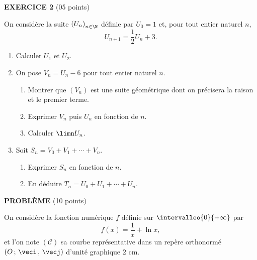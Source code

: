 \begin{devoirsurveille}
\vspace{0.7em}
\noindent\textbf{\sffamily EXERCICE 2} \hfill \textup{(05 points)}

On considère la suite $\left(U_{n}\right)_{n \in \N}$ définie par
$U_{0} = 1$ et, pour tout entier naturel $n$,
\[
  U_{n+1} = \frac12 U_{n}+3 .
\]

\begin{enumerate}[label=\textbf{\arabic*.}, leftmargin=*, itemsep=0.25em]
  \item Calculer $U_{1}$ et $U_{2}$. 
  \item On pose $V_{n} = U_{n}-6$ pour tout entier naturel $n$.
    \begin{enumerate}[label=\textbf{\alph*)}, leftmargin=1.4em, itemsep=0.15em]
      \item Montrer que $\left(V_{n}\right)$ est une suite géométrique dont
            on précisera la raison et le premier terme. 
      \item Exprimer $V_{n}$ puis $U_{n}$ en fonction de $n$.
      \item Calculer $\limn U_{n}$. 
    \end{enumerate}
  \item Soit $S_{n} = V_{0}+V_{1}+\cdots+V_{n}$.
    \begin{enumerate}[label=\textbf{\alph*)}, leftmargin=1.4em, itemsep=0.15em]
      \item Exprimer $S_{n}$ en fonction de $n$. 
      \item En déduire $T_{n} = U_{0}+U_{1}+\cdots+U_{n}$. 
    \end{enumerate}
\end{enumerate}

\vspace{0.7em}
\noindent\textbf{\sffamily PROBLÈME} \hfill \textup{(10 points)}

On considère la fonction numérique $f$ définie sur
$\intervalleo{0}{+\infty}$ par
\[
  f(x) = \frac{1}{x}+\ln x ,
\]
et l'on note $(\mathcal C)$ sa courbe représentative dans un repère
orthonormé $\left(O\,;\,\veci\,,\,\vecj\right)$ d'unité graphique $2$ cm.


\end{devoirsurveille}
